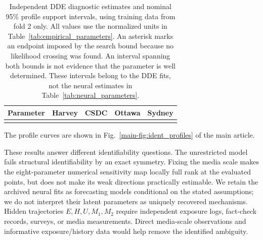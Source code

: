 \begin{table}[t]
\centering\scriptsize
\caption{Independent DDE diagnostic estimates and nominal 95\% profile support intervals, using training data from fold 2 only. All values use the normalized units in Table~\ref{tab:empirical_parameters}. An asterisk marks an endpoint imposed by the search bound because no likelihood crossing was found. An interval spanning both bounds is not evidence that the parameter is well determined. These intervals belong to the DDE fits, not the neural estimates in Table~\ref{tab:neural_parameters}.}
\label{tab:profile_parameters}
\setlength{\tabcolsep}{5pt}
\begin{tabular}{lcccc}
\toprule Parameter & Harvey & CSDC & Ottawa & Sydney\\\midrule

\\[-6pt]\bottomrule
\end{tabular}
\end{table}

The profile curves are shown in Fig.~\ref{main-fig:ident_profiles} of the main article.



These results answer different identifiability questions. The unrestricted model fails structural identifiability by an exact symmetry. Fixing the media scale makes the eight-parameter numerical sensitivity map locally full rank at the evaluated points, but does not make its weak directions practically estimable. We retain the archived neural fits as forecasting models conditional on the stated assumptions; we do not interpret their latent parameters as uniquely recovered mechanisms. Hidden trajectories $E,H,U,M_1,M_2$ require independent exposure logs, fact-check records, surveys, or media measurements. Direct media-scale observations and informative exposure/history data would help remove the identified ambiguity.
